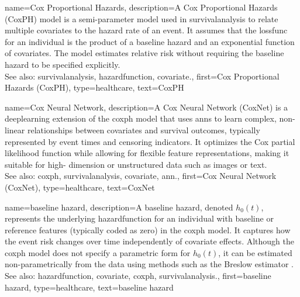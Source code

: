 {name={Cox Proportional Hazards},
  description={A Cox Proportional Hazards 
               (CoxPH) \gls{model} is a semi-\gls{parameter} \gls{model} 
               used in \gls{survivalanalysis} to relate multiple \glspl{covariate} 
               to the hazard rate of an event. It assumes that the \gls{lossfunc} 
               for an individual is the product of a \gls{baseline} hazard and an 
               exponential function of \glspl{covariate}. The \gls{model} estimates 
               relative \gls{risk} without requiring the \gls{baseline} hazard to be specified explicitly.
    \\
    See also: \gls{survivalanalysis}, \gls{hazardfunction}, \gls{covariate}.},
  first={Cox Proportional Hazards (CoxPH)},
  type=healthcare,
  text={CoxPH}
}

{name={Cox Neural Network},
  description={A Cox Neural Network (CoxNet) is a 
               \gls{deeplearning} extension of the \gls{coxph} \gls{model} 
               that uses \glspl{ann} to learn complex, non-linear relationships 
               between \glspl{covariate} and survival outcomes, typically 
               represented by event times and censoring indicators. 
                It optimizes the Cox partial likelihood function while allowing 
                for flexible \gls{feature} representations, making it suitable 
                for high- \gls{dimension} or unstructured \gls{data} such as images or text.
    \\
    See also: \gls{coxph}, \gls{survivalanalysis}, \gls{covariate}, \gls{ann}.},
  first={Cox Neural Network (CoxNet)},
  type=healthcare,
  text={CoxNet}
}

{name={baseline hazard},
  description={A \gls{baseline} hazard, denoted \(h_{0}(t)\), represents the underlying 
    \gls{hazardfunction} for an individual with \gls{baseline} or reference \glspl{feature} (typically coded as zero) 
    in the \gls{coxph} \gls{model}. It captures how the event risk changes over time independently of \gls{covariate} effects. 
    Although the \gls{coxph} \gls{model} does not specify a parametric form for \(h_{0}(t)\), it can be estimated 
    non-parametrically from the \gls{data} using methods such as the Breslow estimator \cite{Kleinbaum2012}. 
    \\
    See also: \gls{hazardfunction}, \gls{covariate}, \gls{coxph}, \gls{survivalanalysis}.},
  first={baseline hazard},
  type=healthcare,
  text={baseline hazard}
}